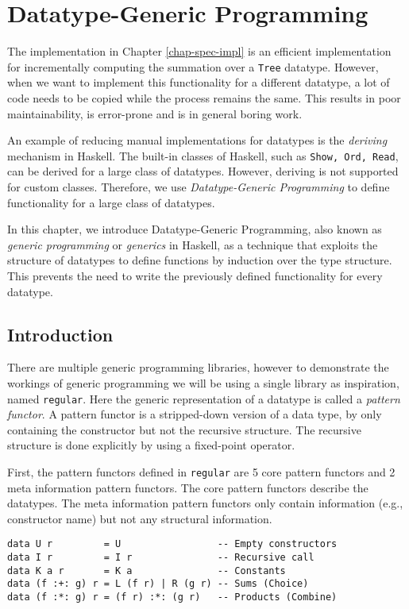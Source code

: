 \chapter{Datatype-Generic Programming}

The implementation in Chapter \ref{chap-spec-impl} is an efficient implementation for incrementally computing the summation over a \texttt{Tree} datatype. However, when we want to implement this functionality for a different datatype, a lot of code needs to be copied while the process remains the same. This results in poor maintainability, is error-prone and is in general boring work.

An example of reducing manual implementations for datatypes is the \textit{deriving} mechanism in Haskell. The built-in classes of Haskell, such as \texttt{Show, Ord, Read}, can be derived for a large class of datatypes. However, deriving is not supported for custom classes. Therefore, we use \textit{Datatype-Generic Programming}\cite*{gibbons2006datatype} to define functionality for a large class of datatypes.

In this chapter, we introduce Datatype-Generic Programming, also known as \textit{generic programming} or \textit{generics} in Haskell, as a technique that exploits the structure of datatypes to define functions by induction over the type structure. This prevents the need to write the previously defined functionality for every datatype.

\section{Introduction}
There are multiple generic programming libraries, however to demonstrate the workings of generic programming we will be using a single library as inspiration, named \texttt{regular}\cite*{regular2022}. Here the generic representation of a datatype is called a \textit{pattern functor}. A pattern functor is a stripped-down version of a data type, by only containing the constructor but not the recursive structure. The recursive structure is done explicitly by using a fixed-point operator. 

First, the pattern functors defined in \texttt{regular} are 5 core pattern functors and 2 meta information pattern functors. The core pattern functors describe the datatypes. The meta information pattern functors only contain information (e.g., constructor name) but not any structural information.

\begin{verbatim}
data U r         = U                 -- Empty constructors
data I r         = I r               -- Recursive call
data K a r       = K a               -- Constants
data (f :+: g) r = L (f r) | R (g r) -- Sums (Choice)
data (f :*: g) r = (f r) :*: (g r)   -- Products (Combine)
\end{verbatim}

